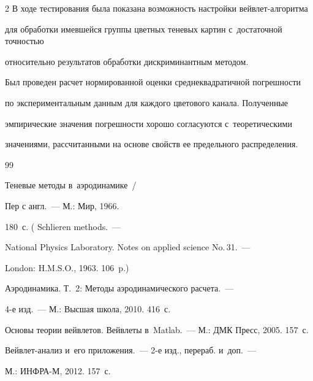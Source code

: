 \begin{multicols}{2}
В ходе тестирования была показана возможность настройки вейв\-лет-ал\-го\-рит\-ма 

для обработки имевшейся группы цветных теневых картин с~достаточной точностью 

относительно результатов обработки дискриминантным методом.



Был проведен расчет нормированной оценки среднеквадратичной погрешности 

по экспериментальным данным для каждого цветового канала. Полученные 

эмпирические значения погрешности хорошо согласуются с~теоретическими 

значениями, рассчитанными на основе свойств ее предельного распределения.



{\small\frenchspacing

 {%


 \begin{thebibliography}{99}


     Теневые методы в~аэродинамике~/

    Пер с англ.~--- М.: Мир, 1966.

    180~с. ( Schlieren methods.~---

    National Physics Laboratory. Notes on applied science No.\,31.~---

    London: H.M.S.O., 1963. 106~p.)


     Аэродинамика. Т.~2: Методы аэродинамического расчета.~---

     4-е изд.~--- М.: Высшая школа, 2010. 416~с.



    Основы теории вейв\-ле\-тов. Вейвлеты в~Matlab.~--- М.: ДМК Пресс, 2005. 157~с.



    Вей\-в\-лет-ана\-лиз и~его приложения.~--- 2-е изд., перераб. и~доп.~--- 

    М.: ИНФРА-М, 2012. 157~с.


\end{thebibliography}}}
\end{multicols}
